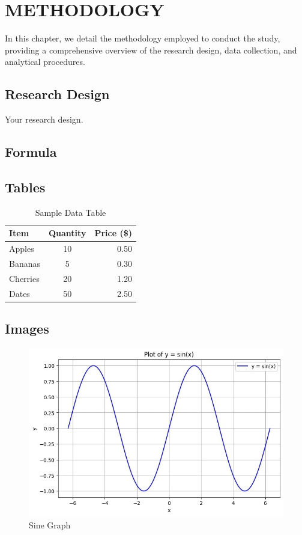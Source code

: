 \chapter{METHODOLOGY}
{\baselineskip
	
	In this chapter, we detail the methodology employed to conduct the study, providing a comprehensive overview of the research design, data collection, and analytical procedures.
	
	\section{Research Design}
	Your research design.
	
	\section{Formula}
	
	\section{Tables}
	
	\begin{table}[ht]
		\centering
		\caption{Sample Data Table}
		\label{tab:sample}
		\begin{tabular}{l c r}
			\toprule
			\textbf{Item} & \textbf{Quantity} & \textbf{Price (\$)} \\
			\midrule
			Apples   & 10 & 0.50 \\
			Bananas  & 5  & 0.30 \\
			Cherries & 20 & 1.20 \\
			Dates    & 50 & 2.50 \\
			\bottomrule
		\end{tabular}
	\end{table}
	
	\section{Images}
	
	\begin{figure}[ht]
		\centering
		\includegraphics[width=0.7\linewidth]{figures/sinegraph}
		\caption{Sine Graph}
		\label{fig:sinegraph}
	\end{figure}
	
}
